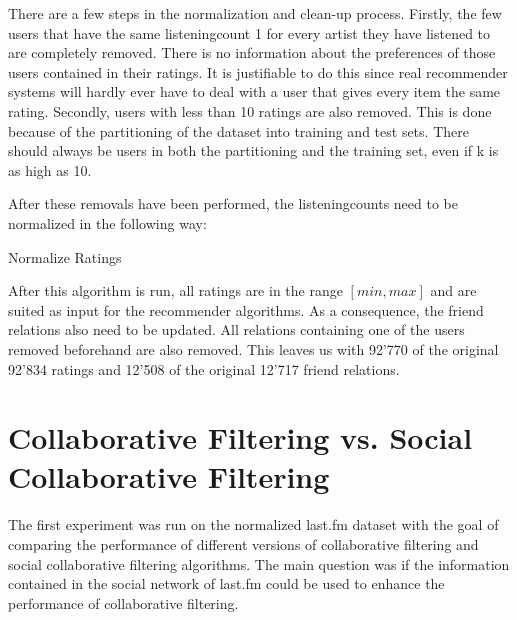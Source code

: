 There are a few steps in the normalization and clean-up process. Firstly, the few users that have the same listeningcount 1 for every artist they have listened to are completely removed. There is no information about the preferences of those users contained in their ratings. It is justifiable to do this since real recommender systems will hardly ever have to deal with a user that gives every item the same rating. Secondly, users with less than 10 ratings are also removed. This is done because of the partitioning of the dataset into training and test sets. There should always be users in both the partitioning and the training set, even if k is as high as 10.

After these removals have been performed, the listeningcounts need to be normalized in the following way:
\newline

\begin{algorithm}[H]
\SetAlgoLined
{}
\caption{Normalize Ratings}
\end{algorithm}

After this algorithm is run, all ratings are in the range $[min,max]$ and are suited as input for the recommender algorithms. As a consequence, the friend relations also need to be updated. All relations containing one of the users removed beforehand are also removed. This leaves us with 92'770 of the original 92'834 ratings and 12'508 of the original 12'717 friend relations.

\section{Collaborative Filtering vs. Social Collaborative Filtering}
\label{cfvssocialcf} The first experiment was run on the normalized last.fm dataset with the goal of comparing the performance of different versions of collaborative filtering and social collaborative filtering algorithms. The main question was if the information contained in the social network of last.fm could be used to enhance the performance of collaborative filtering.

